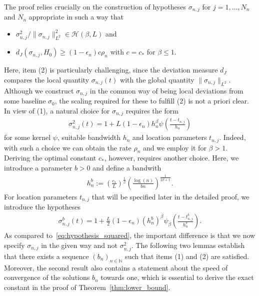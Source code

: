 \documentclass[10.5pt,letter]{article}
\numberwithin{equation}{section}
\theoremstyle{definition}
\newcommand{\N}{\mathbb{N}}
\newcommand{\1}{\mathbbm{1}}
\begin{document}
The proof relies crucially on the construction of hypotheses $\sigma_{n,j}$ for $j=1,\dots, N_n$ and $N_n$ appropriate in such a way that
\begin{itemize}\label{condition_alternatives}
    \item[(1)] $\sigma_{n,j}^2/\|\sigma_{n,j}\|_{L^2}^2\in\mathcal{H}(\beta,L)$ and
    \item[(2)] $d_J(\sigma_{n,j},H_0) \geq (1-\epsilon_n)c\rho_n$ with $c=c_*$ for $\beta\leq 1$.
\end{itemize}
Here, item (2) is particularly challenging, since the deviation measure $d_J$ compares the local quantity $\sigma_{n,j}(t)$ with the global quantity $\|\sigma_{n,j}\|_{L^2}$. Although we construct $\sigma_{n,j}$ in the common way of being local deviations from some baseline $\sigma_0$, the scaling required for these to fulfill (2) is not a priori clear. In view of (1), a natural choice for $\sigma_{n,j}$ requires the form
\begin{align}\label{eq:hypothesis_squared}
    \sigma_{n,j}^2(t) = 1+ L(1-\epsilon_n) h_n^\beta \psi\left(\frac{t-t_{n,j}}{h_n}\right)
\end{align} 
for some kernel $\psi$, suitable bandwidth $h_n$ and location parameters $t_{n,j}$. Indeed, with such a choice we can obtain the rate $\rho_n$ and we employ it for $\beta>1$. Deriving the optimal constant $c_*$, however, requires another choice. Here, we introduce a parameter $b>0$ and define a bandwith
\begin{align}\label{eq:h_nb}
    h_n^b := \left(\frac{c_*}{L}\right)^{\frac{1}{\beta}} \left( \frac{\log(n)}{bn}\right)^{\frac{1}{2\beta+1}}.
\end{align} 
For location parameters $t_{n,j}$ that will be specified later in the detailed proof, we introduce the hypotheses
\begin{align}\label{eq:sigma_j}
 \sigma_{n,j}^b(t) = 1+\frac{L}{2}(1-\epsilon_n)(h_n^b)^\beta \psi_\beta\left(\frac{t-t_{n,j}^b}{h_n^b}\right).
\end{align} 
As compared to~\eqref{eq:hypothesis_squared}, the important difference is that we now specify $\sigma_{n,j}$ in the given way and not $\sigma_{n,j}^2$.
The following two lemmas establish that there exists a sequence $(b_n)_{n\in\N}$ such that items (1) and (2) are satisfied. Moreover, the second result also contains a statement about the speed of convergence of the solutions $b_n$ towards one, which is essential to derive the exact constant in the proof of Theorem~\ref{thm:lower_bound}.
\end{document}
